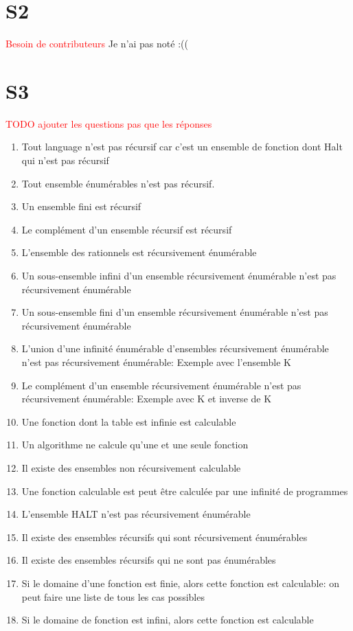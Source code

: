 \documentclass{report}
\begin{document}
\section{S2}
\textcolor{red}{Besoin de contributeurs}
Je n'ai pas noté :(( 

\section{S3}
\textcolor{red}{TODO ajouter les questions pas que les réponses}

\begin{enumerate}
\item Tout language n'est pas récursif car c'est un ensemble de fonction dont Halt qui n'est pas récursif
\item Tout ensemble énumérables n'est pas récursif.
\item Un ensemble fini est récursif
\item Le complément d'un ensemble récursif est récursif
\item L'ensemble des rationnels est récursivement énumérable
\item Un sous-ensemble infini d'un ensemble récursivement énumérable n'est pas récursivement énumérable
\item Un sous-ensemble fini d'un ensemble récursivement énumérable n'est pas récursivement énumérable
\item L’union d’une infinité énumérable d’ensembles récursivement énumérable n'est pas récursivement énumérable: Exemple avec l'ensemble K
\item Le complément d’un ensemble récursivement énumérable n'est  pas récursivement énumérable: Exemple avec K et inverse de K
\item Une fonction dont la table est infinie est calculable
\item Un algorithme ne calcule qu'une et une seule fonction
\item Il existe des ensembles non récursivement calculable
\item Une fonction calculable est peut être calculée par une infinité de programmes
\item L'ensemble HALT n'est pas récursivement énumérable
\item Il existe des ensembles récursifs qui sont récursivement énumérables
\item Il existe des ensembles récursifs qui ne sont pas énumérables
\item Si le domaine d'une fonction est finie, alors cette fonction est calculable: on peut faire une liste de tous les cas possibles
\item Si le domaine de fonction est infini, alors cette fonction est calculable
\end{enumerate}
\end{document}
